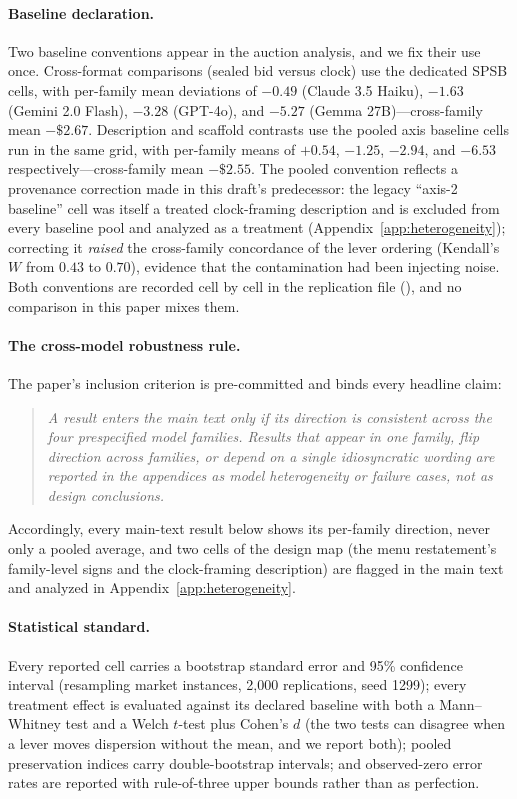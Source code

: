 \paragraph{Baseline declaration.}
Two baseline conventions appear in the auction analysis, and we fix their use once. Cross-format comparisons (sealed bid versus clock) use the dedicated SPSB cells, with per-family mean deviations of $-0.49$ (Claude 3.5 Haiku), $-1.63$ (Gemini 2.0 Flash), $-3.28$ (GPT-4o), and $-5.27$ (Gemma 27B)---cross-family mean $-\$2.67$. Description and scaffold contrasts use the pooled axis baseline cells run in the same grid, with per-family means of $+0.54$, $-1.25$, $-2.94$, and $-6.53$ respectively---cross-family mean $-\$2.55$. The pooled convention reflects a provenance correction made in this draft's predecessor: the legacy ``axis-2 baseline'' cell was itself a treated clock-framing description and is excluded from every baseline pool and analyzed as a treatment (Appendix~\ref{app:heterogeneity}); correcting it \emph{raised} the cross-family concordance of the lever ordering (Kendall's $W$ from $0.43$ to $0.70$), evidence that the contamination had been injecting noise. Both conventions are recorded cell by cell in the replication file (), and no comparison in this paper mixes them.

\paragraph{The cross-model robustness rule.}
The paper's inclusion criterion is pre-committed and binds every headline claim:
\begin{quote}
\emph{A result enters the main text only if its direction is consistent across the four prespecified model families. Results that appear in one family, flip direction across families, or depend on a single idiosyncratic wording are reported in the appendices as model heterogeneity or failure cases, not as design conclusions.}
\end{quote}
Accordingly, every main-text result below shows its per-family direction, never only a pooled average, and two cells of the design map (the menu restatement's family-level signs and the clock-framing description) are flagged in the main text and analyzed in Appendix~\ref{app:heterogeneity}.

\paragraph{Statistical standard.}
Every reported cell carries a bootstrap standard error and 95\% confidence interval (resampling market instances, 2{,}000 replications, seed 1299); every treatment effect is evaluated against its declared baseline with both a Mann--Whitney test and a Welch $t$-test plus Cohen's $d$ (the two tests can disagree when a lever moves dispersion without the mean, and we report both); pooled preservation indices carry double-bootstrap intervals; and observed-zero error rates are reported with rule-of-three upper bounds rather than as perfection.

